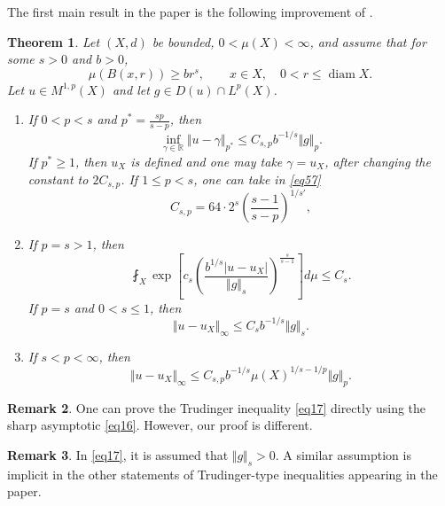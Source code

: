 \documentclass[12pt,leqno]{amsart}
\newtheorem{theorem}{Theorem}
\theoremstyle{definition}
\newtheorem{remark}[theorem]{Remark}
\def\diam{\operatorname{diam}}
\numberwithin{theorem}{section} \numberwithin{equation}{section}
\begin{document}
The first main result in the paper is the following improvement of \cite[Theorem~6]{hajlasz2}.
\begin{theorem}
\label{T1}
Let $(X,d)$ be bounded, $0<\mu(X)<\infty$, and assume that for some $s>0$ and $b>0$,
\begin{equation}
\label{eq1}
 \mu(B(x,r))\ge br^s,
 \qquad x\in X,\quad 0<r\leq\diam X.
\end{equation}
Let $u\in M^{1,p}(X)$ and let $g\in D(u)\cap L^p(X)$.
\begin{enumerate}
\item If $0<p<s$ and $p^*=\frac{sp}{s-p}$,
then
\begin{equation}
\label{eq57}
 \inf_{\gamma\in\mathbb R}\Vert u-\gamma\Vert_{p^*}
 \leq C_{s,p}b^{-1/s}\Vert g\Vert_p.
\end{equation}
If $p^*\ge1$, then $u_X$ is defined and one may take $\gamma=u_X$, after changing the constant to $2C_{s,p}$. If $1\leq p<s$, one can take in \eqref{eq57}
\begin{equation}
\label{eq16}
C_{s,p}=64\cdot 2^s\left(\frac{s-1}{s-p}\right)^{1/s'},
\end{equation}
\item If $p=s>1$, then
\begin{equation}
\label{eq17}
\fint_X
 \exp\!\left[
 c_s\left(
 \frac{b^{1/s}|u-u_X|}{\Vert g\Vert_{s}}
 \right)^{\frac{s}{s-1}}
 \right]d\mu
 \leq C_s.
\end{equation}
If $p=s$ and $0<s\leq1$, then
\[
 \Vert u-u_X\Vert_{\infty}
 \leq C_s b^{-1/s}\Vert g\Vert_{s}.
\]

\item If $s<p<\infty$, then
\[
 \Vert u-u_X\Vert_{\infty}
 \leq C_{s,p}b^{-1/s}\mu(X)^{1/s-1/p}\Vert g\Vert_p.
\]
\end{enumerate}
\end{theorem}
\begin{remark}
One can prove the Trudinger inequality \eqref{eq17}  directly using the sharp asymptotic \eqref{eq16}. However, our proof is different.
\end{remark}
\begin{remark}
In \eqref{eq17}, it is assumed that $\Vert g\Vert_s>0$. A similar assumption is implicit in the other statements of Trudinger-type inequalities appearing in the paper.
\end{remark}
\end{document}
